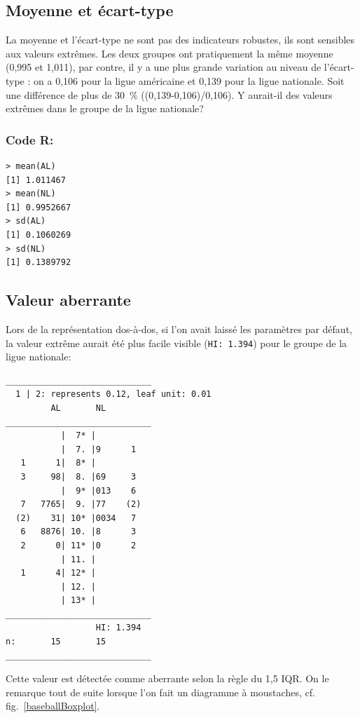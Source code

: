 \documentclass[10pt,twocolumn]{article}
\begin{document}
\subsection{Moyenne et écart-type}
La moyenne et l’écart-type ne sont pas des indicateurs robustes, ils sont sensibles aux valeurs extrêmes. Les deux groupes ont pratiquement la même moyenne (0,995 et 1,011), par contre, il y a une plus grande variation au niveau de l’écart-type : on a 0,106 pour la ligue américaine et 0,139 pour la ligue nationale. Soit une différence de plus de 30~\% ((0,139-0,106)/0,106). Y aurait-il des valeurs extrêmes dans le groupe de la ligue nationale?

\subsubsection*{Code R:}
\begin{verbatim}
> mean(AL)
[1] 1.011467
> mean(NL)
[1] 0.9952667
> sd(AL)
[1] 0.1060269
> sd(NL)
[1] 0.1389792
\end{verbatim}


\subsection{Valeur \og aberrante\fg{}}
Lors de la représentation dos-à-dos, si l’on avait laissé les paramètres par défaut, la valeur extrême aurait été plus facile visible (\texttt{HI: 1.394}) pour le groupe de la ligue nationale:
\begin{verbatim}
_____________________________
  1 | 2: represents 0.12, leaf unit: 0.01 
         AL       NL     
_____________________________
           |  7* |           
           |  7. |9      1   
   1      1|  8* |           
   3     98|  8. |69     3   
           |  9* |013    6   
   7   7765|  9. |77    (2)  
  (2)    31| 10* |0034   7   
   6   8876| 10. |8      3   
   2      0| 11* |0      2   
           | 11. |           
   1      4| 12* |           
           | 12. |           
           | 13* |           
_____________________________
                  HI: 1.394  
n:       15       15     
_____________________________
\end{verbatim}

Cette valeur est détectée comme aberrante selon la règle du 1,5 IQR. On le remarque tout de suite lorsque l’on fait un diagramme à moustaches, cf. fig.~\ref{baseballBoxplot}.
\end{document}

